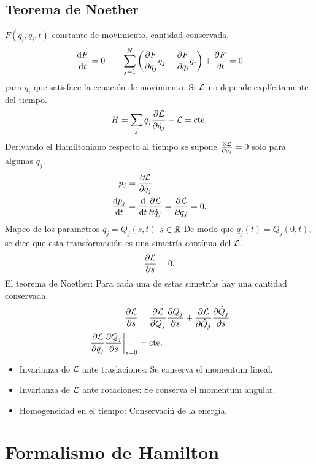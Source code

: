\subsection{Teorema de Noether}
\begin{definition}
	$F(q_i, \dot{q}_i, t)$ constante de movimiento, cantidad conservada.
	\begin{equation}
		\dv{F}{t} = 0 \qquad \sum _{j=1} ^N \qty(\pdv{F}{q_j} \dot{q}_j + \pdv{F}{\dot{q}_i} \ddot{q}_i) + \pdv{F}{t} = 0
	\end{equation}
	para $q_i$ que satisface la ecuación de movimiento. Si $\mathcal{L}$ no depende explícitamente del tiempo.
	\begin{equation}
		H = \sum _j \dot{q}_j \pdv{\mathcal{L}}{\dot{q}_j} - \mathcal{L} = \text{cte}.
	\end{equation}
	Derivando el Hamiltoniano respecto al tiempo se supone $\pdv{\mathcal{L}}{q_j} = 0$ solo para algunas $q_j$.
	\begin{align*}
		p_j &= \pdv{\mathcal{L}}{\dot{q}_j} \\
		\dv{p_j}{t} &= \dv{t} \pdv{\mathcal{L}}{\dot{q}_j} = \pdv{\mathcal{L}}{q_j} = 0.
	\end{align*}
	Mapeo de los parametros $q_j = Q_j (s,t)$ $s\in \mathbb{R}$ De modo que $q_j (t) = Q_j (0,t)$, se dice que esta transformación es una simetría contínua del $\mathcal{L}$.
	\begin{equation}
		\pdv{\lagran}{s} (Q_j (s,t), \dot{Q}_j (s,t)) = 0.
	\end{equation}
	El teorema de Noether: Para cada una de estas simetrías hay una cantidad conservada.
	\begin{align*}
		\pdv{\lagran}{s} &= \pdv{\lagran}{Q_j} \pdv{Q_j}{s} + \pdv{\lagran}{\dot{Q}_j} \pdv{\dot{Q}_j}{s} \\
		\eval{\pdv{\lagran}{\dot{q}_j} \pdv{Q_j}{s}}_{s=0} &= \text{cte}.
	\end{align*}
	\begin{itemize}
		\item Invarianza de $\mathcal{L}$ ante traslaciones: Se conserva el momentum lineal.
		\item Invarianza de $\mathcal{L}$ ante rotaciones: Se conserva el momentum angular.
		\item Homogeneidad en el tiempo: Conservaciń de la energía.
	\end{itemize}
\end{definition}

\section{Formalismo de Hamilton}


